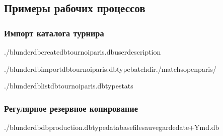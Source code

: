 \documentclass[letterpaper,10pt,russian]{sphinxmanual}
\begin{document}
\subsection{Примеры рабочих процессов}
\label{\detokenize{cli:exemples-de-flux-de-travail}}

\subsubsection{Импорт каталога турнира}
\label{\detokenize{cli:import-d-un-repertoire-de-tournoi}}
\begin{sphinxVerbatim}[commandchars=\\\{\}]
./blunderdbcreate\PYGZhy{}\PYGZhy{}dbtournoi\PYGZus{}paris.db\PYGZhy{}\PYGZhy{}user\PYGZhy{}\PYGZhy{}description

./blunderdbimport\PYGZhy{}\PYGZhy{}dbtournoi\PYGZus{}paris.db\PYGZhy{}\PYGZhy{}typebatch\PYGZhy{}\PYGZhy{}dir./matchs\PYGZus{}open\PYGZus{}paris/

./blunderdblist\PYGZhy{}\PYGZhy{}dbtournoi\PYGZus{}paris.db\PYGZhy{}\PYGZhy{}typestats
\end{sphinxVerbatim}


\subsubsection{Регулярное резервное копирование}
\label{\detokenize{cli:sauvegarde-reguliere}}
\begin{sphinxVerbatim}[commandchars=\\\{\}]
./blunderdb\PYGZhy{}\PYGZhy{}dbproduction.db\PYGZhy{}\PYGZhy{}typedatabase\PYGZhy{}\PYGZhy{}filesauvegarde\PYGZhy{}date+\PYGZpc{}Y\PYGZpc{}m\PYGZpc{}d.db
\end{sphinxVerbatim}
\end{document}
